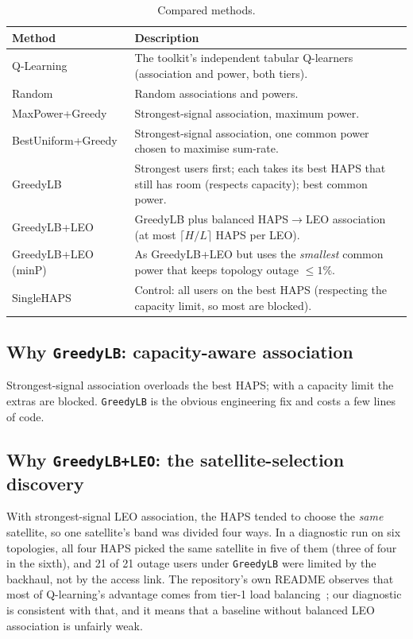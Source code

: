 \documentclass[11pt,a4paper]{article}
\begin{document}
\begin{table}[h]
\centering\small
\begin{tabular}{p{3.6cm}p{11cm}}
\toprule
\textbf{Method} & \textbf{Description}\\
\midrule
Q-Learning & The toolkit's independent tabular Q-learners (association and power, both tiers).\\
Random & Random associations and powers.\\
MaxPower+Greedy & Strongest-signal association, maximum power.\\
BestUniform+Greedy & Strongest-signal association, one common power chosen to maximise sum-rate.\\
GreedyLB & Strongest users first; each takes its best HAPS that still has room (respects capacity); best common power.\\
GreedyLB+LEO & GreedyLB plus balanced HAPS$\rightarrow$LEO association (at most $\lceil H/L\rceil$ HAPS per LEO).\\
GreedyLB+LEO (minP) & As GreedyLB+LEO but uses the \emph{smallest} common power that keeps topology outage $\le1\%$.\\
SingleHAPS & Control: all users on the best HAPS (respecting the capacity limit, so most are blocked).\\
\bottomrule
\end{tabular}
\caption{Compared methods.}
\label{tab:methods}
\end{table}

\subsection{Why \texttt{GreedyLB}: capacity-aware association}
Strongest-signal association overloads the best HAPS; with a capacity limit the extras are blocked. \texttt{GreedyLB} is the obvious engineering fix and costs a few lines of code.

\subsection{Why \texttt{GreedyLB+LEO}: the satellite-selection discovery}
With strongest-signal LEO association, the HAPS tended to choose the \emph{same} satellite, so one satellite's band was divided four ways. In a diagnostic run on six topologies, all four HAPS picked the same satellite in five of them (three of four in the sixth), and 21 of 21 outage users under \texttt{GreedyLB} were limited by the backhaul, not by the access link. The repository's own README observes that most of Q-learning's advantage comes from tier-1 load balancing~\cite{repo}; our diagnostic is consistent with that, and it means that a baseline without balanced LEO association is unfairly weak.
\end{document}
